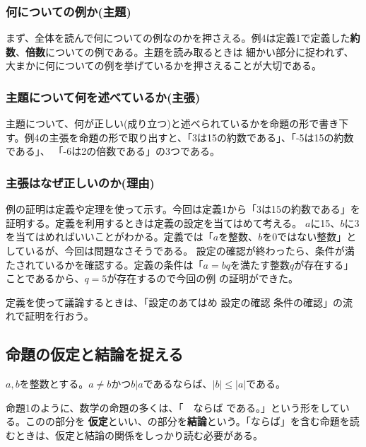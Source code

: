 \documentclass{jlreq}
\begin{document}
\subsubsection{何についての例か(主題)}
まず、全体を読んで何についての例なのかを押さえる。例4は定義1で定義した\textbf{約数}、\textbf{倍数}についての例である。主題を読み取るときは
細かい部分に捉われず、大まかに何についての例を挙げているかを押さえることが大切である。

\subsubsection{主題について何を述べているか(主張)}
主題について、何が正しい(成り立つ)と述べられているかを命題の形で書き下す。例4の主張を命題の形で取り出すと、「3は15の約数である」、「-5は15の約数である」、
「-6は2の倍数である」の3つである。

\subsubsection{主張はなぜ正しいのか(理由)}
例の証明は定義や定理を使って示す。今回は定義1から「3は15の約数である」を証明する。定義を利用するときは定義の設定を当てはめて考える。
$a$に15、$b$に3を当てはめればいいことがわかる。定義では「$a$を整数、$b$を0ではない整数」としているが、今回は問題なさそうである。
設定の確認が終わったら、条件が満たされているかを確認する。定義の条件は「$a = bq$を満たす整数$q$が存在する」ことであるから、$q = 5$が存在するので今回の例
の証明ができた。

定義を使って議論するときは、「設定のあてはめ \rightarrow 設定の確認 \rightarrow 条件の確認」の流れで証明を行おう。

\subsection{命題の仮定と結論を捉える}
\begin{tcolorbox}[enhanced,title=命題1, 
  attach boxed title to top left, 
  colback=white!95!blue,
  colbacktitle=white!10!blue!50!black,
  drop fuzzy shadow,
  boxrule=0.25mm,
  ]
  $a, b$を整数とする。$a \neq b$かつ$b | a$であるならば、$|b| \leq |a|$である。
\end{tcolorbox}

命題1のように、数学の命題の多くは、「\triangle \triangle　ならば \star \star である。」という形をしている。この\triangle \triangle の部分を
\textbf{仮定}といい、\star \star の部分を\textbf{結論}という。「ならば」を含む命題を読むときは、仮定と結論の関係をしっかり読む必要がある。
\end{document}
